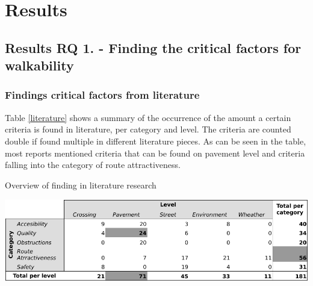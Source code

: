 \chapter[Results]{Results}
\section{Results RQ 1. - Finding the critical factors for walkability}
\subsection{Findings critical factors from literature}
Table \ref{literature} shows a summary of the occurrence of the amount a certain criteria is found in literature, per category and level. The criteria are counted double if found multiple in different literature pieces. As can be seen in the table, most reports mentioned criteria that can be found on pavement level and criteria falling into the category of route attractiveness. \newline

\begin{table}[H]
\centering
\caption{Overview of finding in literature research \label{literature}}
\includegraphics[width=\textwidth]{img/R_Final_overview_literature_summary.pdf}
\end{table}

